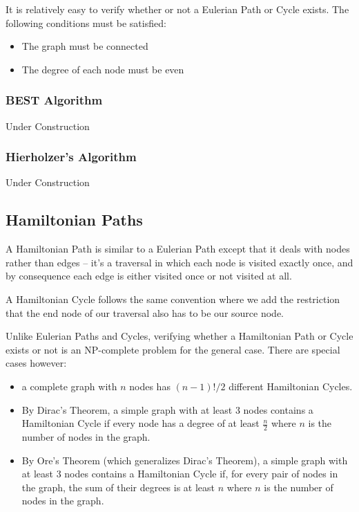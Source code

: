 It is relatively easy to verify whether or not a Eulerian Path or Cycle exists. The following conditions must be satisfied:
\begin{itemize}
\item The graph must be connected
\item The degree of each node must be even
\end{itemize}

\subsubsection{BEST Algorithm}

Under Construction

\subsubsection{Hierholzer's Algorithm}

Under Construction

\subsection{Hamiltonian Paths}
 

A Hamiltonian Path is similar to a Eulerian Path except that it deals with nodes rather than edges -- it's a traversal in which each node is visited exactly once, and by consequence each edge is either visited once or not visited at all.

A Hamiltonian Cycle follows the same convention where we add the restriction that the end node of our traversal also has to be our source node.

Unlike Eulerian Paths and Cycles, verifying whether a Hamiltonian Path or Cycle exists or not is an NP-complete problem for the general case. There are special cases however:
\begin{itemize}
\item a complete graph with $n$ nodes has $(n-1)!/2$ different Hamiltonian Cycles.
\item By Dirac's Theorem, a simple graph with at least 3 nodes contains a Hamiltonian Cycle if every node has a degree of at least $\frac{n}{2}$ where $n$ is the number of nodes in the graph.
\item By Ore's Theorem (which generalizes Dirac's Theorem), a simple graph with at least 3 nodes contains a Hamiltonian Cycle if, for every pair of nodes in the graph, the sum of their degrees is at least $n$ where $n$ is the number of nodes in the graph.
\end{itemize}
